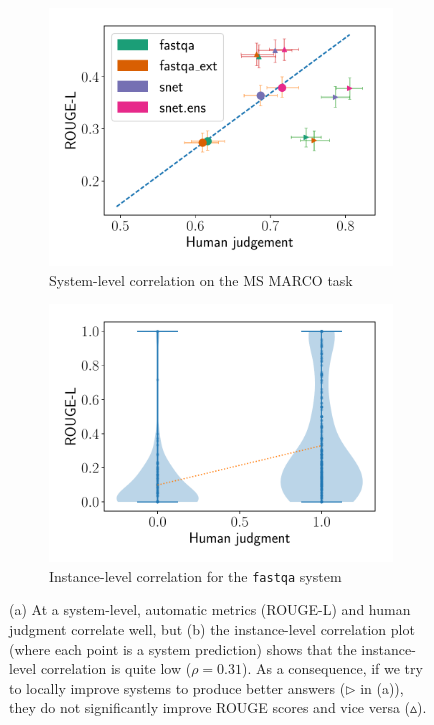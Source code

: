 \begin{figure}[ht]
  \begin{subfigure}{0.49\textwidth}
    \includegraphics[width=\textwidth]{figures/msmarco_bias}
    \caption{\label{fig:bias-msmarco-system} System-level correlation on the MS MARCO task}
  \end{subfigure}
  \hfill
  \begin{subfigure}{0.49\textwidth}
    \includegraphics[width=\textwidth]{figures/msmarco_instance_correlation}
    \caption{\label{fig:bias-msmarco-instance} Instance-level correlation for the \texttt{fastqa} system}
  \end{subfigure}
  \caption{\label{fig:bias-msmarco}
  (a) At a system-level, automatic metrics (ROUGE-L) and human judgment correlate well, but (b) the instance-level correlation plot
  (where each point is a system prediction) shows that the instance-level correlation is quite low ($\rho = 0.31$).
  As a consequence, if we try to locally improve systems to produce better answers ($\triangleright$ in (a)),
  they do not significantly improve ROUGE scores and vice versa ($\vartriangle$).
  }
\end{figure}


